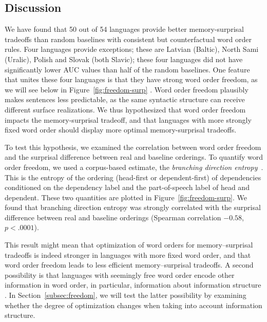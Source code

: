\subsection{Discussion}\label{subsec:expt2-discussion}

We have found that 50 out of 54 languages provide better memory-surprisal tradeoffs than random baselines with consistent but counterfactual word order rules.
Four languages provide exceptions; these are Latvian (Baltic), North Sami (Uralic), Polish and Slovak (both Slavic); these four languages did not have significantly lower AUC values than half of the random baselines.
One feature that unites these four languages is that they have strong word order freedom, as we will see below in Figure~\ref{fig:freedom-surp} .
Word order freedom plausibly makes sentences less predictable, as the same syntactic structure can receive different surface realizations.
We thus hypothesized that word order freedom  impacts the memory-surprisal tradeoff, and that languages with more strongly fixed word order should display more optimal memory-surprisal tradeoffs.


To test this hypothesis, we examined the correlation between word order freedom and the surprisal difference between real and baseline orderings.
To quantify word order freedom, we used a corpus-based estimate, the \emph{branching direction entropy}~\citep{futrell-quantifying-2015}.
This is the entropy of the ordering (head-first or dependent-first) of dependencies conditioned on the dependency label and the part-of-speech label of head and dependent.
These two quantities are plotted in Figure~\ref{fig:freedom-surp}.
We found that branching direction entropy was strongly correlated with the surprisal difference between real and baseline orderings (Spearman correlation $-0.58$, $p < .0001$).

This result might mean that optimization of word orders for memory--surprisal tradeoffs is indeed stronger in languages with more fixed word order, and that word order freedom leads to less efficient memory--surprisal tradeoffs.
A second possibility is that languages with seemingly free word order encode other information in word order, in particular, information about information structure \citep[e.g.][]{givon1988pragmatics,firbas1966defining,firbas1974aspects,myhill1985pragmatic}.
In Section~\ref{subsec:freedom}, we will test the latter possibility by examining whether the degree of optimization changes when taking into account information structure.




